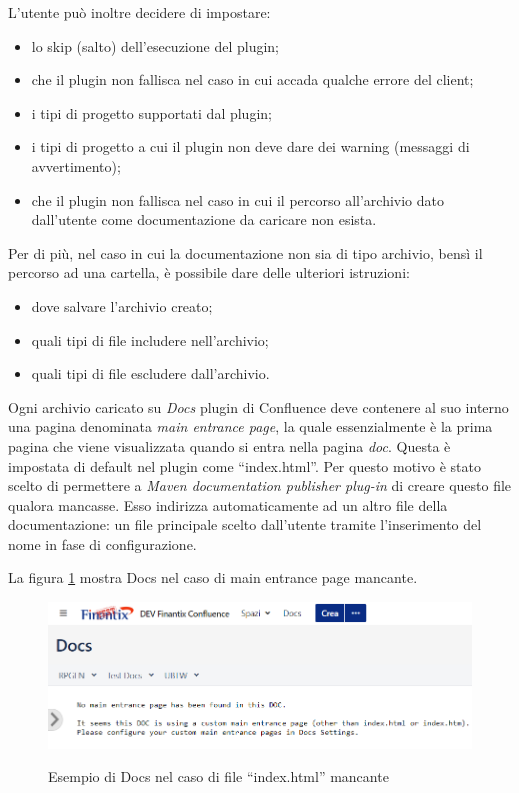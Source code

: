 

	L'utente può inoltre decidere di impostare:
	\begin{itemize}
		\item lo skip (salto) dell'esecuzione del plugin;
		\item che il plugin non fallisca nel caso in cui accada qualche errore del client;
		\item i tipi di progetto supportati dal plugin;
		\item i tipi di progetto a cui il plugin non deve dare dei warning (messaggi di avvertimento);
		\item che il plugin non fallisca nel caso in cui il percorso all'archivio dato dall'utente come documentazione da caricare non esista.
	\end{itemize}

	Per di più, nel caso in cui la documentazione non sia di tipo archivio, bensì il percorso ad una cartella, è possibile dare delle ulteriori istruzioni:
	\begin{itemize}
		\item dove salvare l'archivio creato;
		\item quali tipi di file includere nell'archivio;
		\item quali tipi di file escludere dall'archivio.
	\end{itemize}

	Ogni archivio caricato su \emph{Docs} plugin di Confluence deve contenere al suo interno una pagina denominata \emph{main entrance page}, la quale essenzialmente è la prima pagina che viene visualizzata quando si entra nella pagina \emph{doc}.
	Questa è impostata di default nel plugin come ``index.html''.
	Per questo motivo è stato scelto di permettere a \emph{Maven documentation publisher plug-in} di creare questo file qualora mancasse.
	Esso indirizza automaticamente ad un altro file della documentazione: un file principale scelto dall'utente tramite l'inserimento del nome in fase di configurazione.

	La figura \ref{errorDocs} mostra Docs nel caso di main entrance page mancante.

	\begin{figure}[H]
		\centering
		\includegraphics[width=\textwidth]{immagini/indexError.png}\\
		\caption{Esempio di Docs nel caso di file ``index.html'' mancante}
		\label{errorDocs}
	\end{figure}


